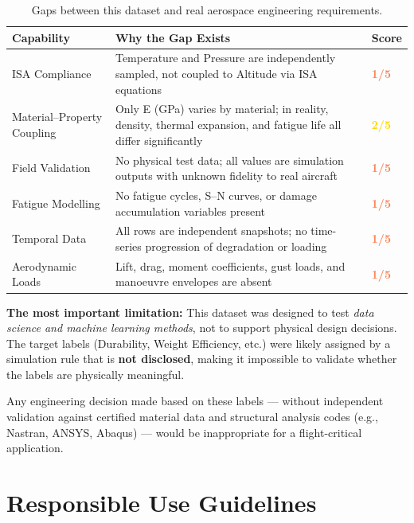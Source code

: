 \documentclass[11pt, a4paper]{report}
\begin{document}
\begin{table}[H]
\centering
\caption{Gaps between this dataset and real aerospace engineering requirements.}
\label{tab:limitations}
\begin{tabularx}{\textwidth}{lXl}
\toprule
\textbf{Capability} & \textbf{Why the Gap Exists} & \textbf{Score} \\
\midrule
ISA Compliance
  & Temperature and Pressure are independently sampled, not coupled to Altitude via ISA equations
  & \textcolor{coral}{\textbf{1/5}} \\[6pt]
Material--Property Coupling
  & Only E (GPa) varies by material; in reality, density, thermal expansion, and fatigue life all differ significantly
  & \textcolor{gold}{\textbf{2/5}} \\[6pt]
Field Validation
  & No physical test data; all values are simulation outputs with unknown fidelity to real aircraft
  & \textcolor{coral}{\textbf{1/5}} \\[6pt]
Fatigue Modelling
  & No fatigue cycles, S--N curves, or damage accumulation variables present
  & \textcolor{coral}{\textbf{1/5}} \\[6pt]
Temporal Data
  & All rows are independent snapshots; no time-series progression of degradation or loading
  & \textcolor{coral}{\textbf{1/5}} \\[6pt]
Aerodynamic Loads
  & Lift, drag, moment coefficients, gust loads, and manoeuvre envelopes are absent
  & \textcolor{coral}{\textbf{1/5}} \\
\bottomrule
\end{tabularx}
\end{table}

\begin{limitbox}
\textbf{The most important limitation:} This dataset was designed to test \emph{data science and machine learning methods}, not to support physical design decisions. The target labels (Durability, Weight Efficiency, etc.) were likely assigned by a simulation rule that is \textbf{not disclosed}, making it impossible to validate whether the labels are physically meaningful.

Any engineering decision made based on these labels --- without independent validation against certified material data and structural analysis codes (e.g., Nastran, ANSYS, Abaqus) --- would be inappropriate for a flight-critical application.
\end{limitbox}

\section{Responsible Use Guidelines}
\end{document}
